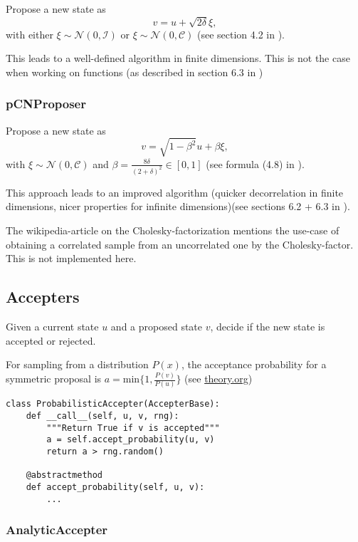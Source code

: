 \documentclass[11pt]{article}
\newcommand{\C}{{\mathcal{C}}}
\newcommand{\I}{{\mathcal{I}}}
\newcommand{\N}[2]{\mathcal{N}\left(#1,#2\right)}
\begin{document}
Propose a new state as
$$v = u + \sqrt{2\delta} \xi,$$
with either \(\xi \sim \N{0}{\I}\) or \(\xi \sim \N{0}{\C}\) (see section 4.2 in \cite{cotter_mcmc_2013}).

This leads to a well-defined algorithm in finite dimensions.
This is not the case when working on functions (as described in section 6.3 in \cite{cotter_mcmc_2013})

\subsubsection{pCNProposer}
\label{sec:orgcfd532b}

Propose a new state as
$$v = \sqrt{1-\beta^2} u + \beta \xi,$$
with \(\xi \sim \N{0}{\C}\) and \(\beta = \frac{8\delta}{(2+\delta)^2} \in [0,1]\)
(see formula (4.8) in \cite{cotter_mcmc_2013}).

This approach leads to an improved algorithm (quicker decorrelation in finite dimensions,
nicer properties for infinite dimensions)(see sections 6.2 + 6.3 in \cite{cotter_mcmc_2013}).

The wikipedia-article on the Cholesky-factorization mentions the use-case of obtaining a
correlated sample from an uncorrelated one by the Cholesky-factor. This is not implemented here.
\subsection{Accepters}
\label{sec:orgc26b409}

Given a current state \(u\) and a proposed state \(v\), decide if the new state is accepted or rejected.

For sampling from a distribution \(P(x)\), the acceptance probability for a symmetric proposal is
\(a = \text{min}\{1, \frac{P(v)}{P(u)}\}\)
(see \url{theory.org})

\begin{verbatim}
class ProbabilisticAccepter(AccepterBase):
    def __call__(self, u, v, rng):
        """Return True if v is accepted"""
        a = self.accept_probability(u, v)
        return a > rng.random()

    @abstractmethod
    def accept_probability(self, u, v):
        ...
\end{verbatim}

\subsubsection{AnalyticAccepter}
\label{sec:org9c629a0}
\end{document}
